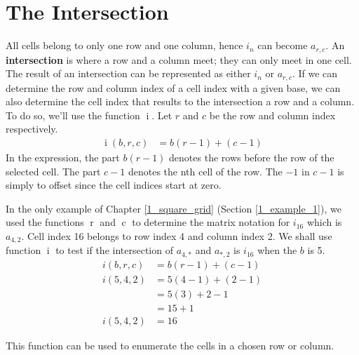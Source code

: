 \documentclass[twoside,openany,12pt]{book}
\begin{document}
    \newpage

    \chapter{The Intersection} \label{intersection}
    All cells belong to only one row and one column, hence $i_n$ can become $a_{r,c}$. An \textbf{intersection} is where a row and a column meet; they can only meet in one cell. The result of an intersection can be represented as either $i_n$ or $a_{r,c}$. If we can determine the row and column index of a cell index with a given base, we can also determine the cell index that results to the intersection a row and a column. To do so, we'll use the function $\operatorname{i}$. Let $r$ and $c$ be the row and column index respectively.
    \begin{equation}
        \begin{split}
          \operatorname{i}(b,r,c) &= b(r-1) + (c - 1)
        \end{split}
    \end{equation}
    In the expression, the part $b(r-1)$ denotes the rows before the row of the selected cell. The part $c - 1$ denotes the nth cell of the row. The $ -1$ in $c-1$ is simply to offset since the cell indices start at zero.

    In the only example of Chapter \ref{1_square_grid} (Section \ref{1_example_1}), we used the functions $\operatorname{r}$ and $\operatorname{c}$ to determine the matrix notation for $i_{16}$ which is $a_{4,2}$. Cell index 16 belongs to row index 4 and column index 2. We shall use function $\operatorname{i}$ to test if the intersection of $a_{4,*}$ and $a_{*,2}$ is $i_{16}$ when the $b$ is 5.
    \begin{equation*}
        \begin{split}
          i(b,r,c) &= b(r-1) + (c - 1) \\
            i(5,4,2) &= 5(4-1) + (2 - 1) \\
                &= 5(3) + 2 - 1 \\
                &= 15 + 1\\
            i(5,4,2) &= 16
        \end{split}
    \end{equation*}

    This function can be used to enumerate the cells in a chosen row or column.
\end{document}

